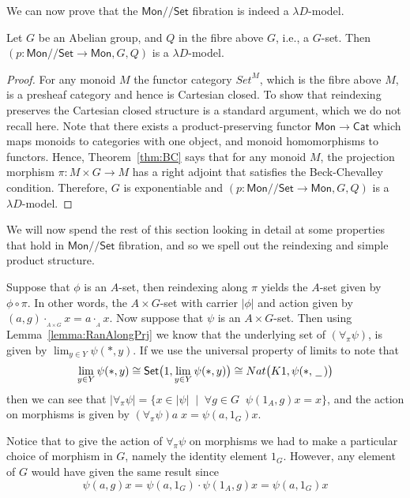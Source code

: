 \documentclass[a4paper,UKenglish]{lipics}
\newcommand{\msf}[1]{\mathsf{#1}} %
\newcommand{\Mon}{\msf{Mon}}
\newcommand{\Set}{\msf{Set}}
\newcommand{\Cat}{\msf{Cat}}
\newcommand{\blank}{\, \underline{\hspace{2mm}} \,}
\newcommand{\act}[1]{\cdot_{_{#1}}}
\newcommand{\GroupSet}[1]{#1/\!/\Set}
\newcommand{\MonSet}{\GroupSet{\Mon}}
\newcommand{\bbracket}[1]{\bigl( #1 \bigr)}
\begin{document}
We can now prove that the $\MonSet$ fibration is indeed a $\lambda D$-model.

\begin{theorem}
\label{thm:gsets}
  Let $G$ be an Abelian group, and $Q$ in the fibre above $G$, i.e., a $G$-set. Then $(p:\MonSet \rightarrow \Mon, G, Q)$ is a $\lambda D$-model.
\end{theorem}

\begin{proof}
For any monoid $M$ the functor category ${Set}^M$, which is the fibre above $M$, is a presheaf category and hence is Cartesian closed. To show that reindexing preserves the Cartesian closed structure is a standard argument, which we do not recall here. Note that there exists a product-preserving functor $\Mon \rightarrow \Cat$ which maps monoids to categories with one object, and monoid homomorphisms to functors. Hence, Theorem~\ref{thm:BC} says that for any monoid $M$, the projection morphism $\pi : M \times G \rightarrow M$ has a right adjoint  that satisfies the Beck-Chevalley condition. Therefore, $G$ is exponentiable and $(p:\MonSet \rightarrow \Mon, G, Q)$ is a $\lambda D$-model.
\end{proof}

We will now spend the rest of this section looking in detail at some properties that hold in $\MonSet$ fibration, and so we spell out the reindexing and simple product structure.

Suppose that $\phi$ is an $A$-set, then reindexing along $\pi$ yields the $A$-set given by $\phi \circ \pi$. In other words, the $A \times G$-set with carrier $|\phi|$ and action given by $(a,g) \act{A\times G} x = a \act{A} x$. Now suppose that $\psi$ is an $A \times G$-set. Then using Lemma~\ref{lemma:RanAlongPrj} we know that the underlying set of $ (\forall _\pi \psi)$, is given by $\lim_{y\in Y} \psi (\ast, y)$. If we use the universal property of limits to note that
\[
 \lim_{y\in Y} \psi (\ast, y) \cong \Set \bbracket{1, \lim_{y\in Y} \psi (\ast, y)} \cong Nat \bbracket{K1, \psi (\ast, \blank)}
\]
then we can see that $|\forall_\pi \psi | = \{x \in |\psi| \; \; | \; \; \forall g\in G \; \; \psi(1_A, g) x = x \}$, and the action on morphisms is given by $(\forall_\pi \psi) a \; x = \psi (a, 1_G) x$.

Notice that to give the action of $\forall_\pi \psi$ on morphisms we had to make a particular choice of morphism in $G$, namely the identity element $1_G$. However, any element of $G$ would have given the same result since
\[
  \psi (a, g) x = \psi (a, 1_G) \cdot \psi (1_A, g) x = \psi (a, 1_G) x
\]
\end{document}
